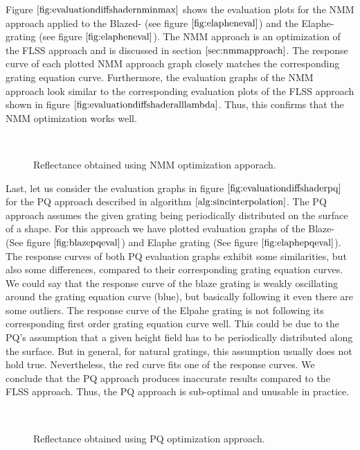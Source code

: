 Figure $\ref{fig:evaluationdiffshadernminmax}$ shows the evaluation plots for the NMM approach applied to the Blazed- (see figure $\ref{fig:elapheneval}$) and the Elaphe-grating (see figure $\ref{fig:elapheneval}$). The NMM approach is an optimization of the FLSS approach and is discussed in section $\ref{sec:nmmapproach}$. The response curve of each plotted NMM approach graph closely matches the corresponding grating equation curve. Furthermore, the evaluation graphs of the NMM approach look similar to the corresponding evaluation plots of the FLSS approach shown in figure $\ref{fig:evaluationdiffshaderalllambda}$. Thus, this confirms that the NMM optimization works well.

\begin{figure}[H]
  \centering
~
\caption[Validation of NMM Approach applied on our Gratings]{Reflectance obtained using NMM optimization apporach.}
\label{fig:evaluationdiffshadernminmax}
\end{figure}

Last, let us consider the evaluation graphs in figure $\ref{fig:evaluationdiffshaderpq}$ for the PQ approach described in algorithm $\ref{alg:sincinterpolation}$. The PQ approach assumes the given grating being periodically distributed on the surface of a shape. For this approach we have plotted evaluation graphs of the Blaze- (See figure $\ref{fig:blazepqeval}$) and Elaphe grating (See figure $\ref{fig:elaphepqeval}$). The response curves of both PQ evaluation graphs exhibit some similarities, but also some differences, compared to their corresponding grating equation curves. We could say that the response curve of the blaze grating is weakly oscillating around the grating equation curve (blue), but basically following it even there are some outliers. The response curve of the Elpahe grating is not following its corresponding first order grating equation curve well. This could be due to the PQ's assumption that a given height field has to be periodically distributed along the surface. But in general, for natural gratings, this assumption usually does not hold true. Nevertheless, the red curve fits one of the response curves. We conclude that the PQ approach produces inaccurate results compared to the FLSS approach. Thus, the PQ approach is sub-optimal and unusable in practice.

\begin{figure}[H]
  \centering
~
\caption[Validation of PQ Approach applied on our Gratings]{Reflectance obtained using PQ optimization approach.}
\label{fig:evaluationdiffshaderpq}
\end{figure}
